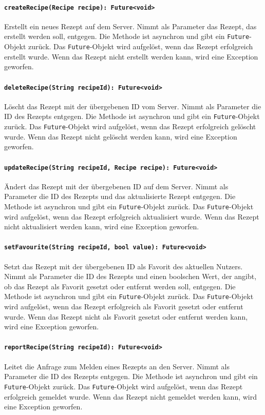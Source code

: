 \documentclass{entwurfsheft}
\begin{document}
\begin{sloppypar}
\paragraph{\texttt{createRecipe(Recipe recipe): Future<void>}}
Erstellt ein neues Rezept auf dem Server. Nimmt als Parameter das Rezept, das erstellt werden soll, entgegen. Die Methode ist asynchron und gibt ein \texttt{Future}-Objekt zurück. Das \texttt{Future}-Objekt wird aufgelöst, wenn das Rezept erfolgreich erstellt wurde. Wenn das Rezept nicht erstellt werden kann, wird eine Exception geworfen.
\paragraph{\texttt{deleteRecipe(String recipeId): Future<void>}}
Löscht das Rezept mit der übergebenen ID vom Server. Nimmt als Parameter die ID des Rezepts entgegen. Die Methode ist asynchron und gibt ein \texttt{Future}-Objekt zurück. Das \texttt{Future}-Objekt wird aufgelöst, wenn das Rezept erfolgreich gelöscht wurde. Wenn das Rezept nicht gelöscht werden kann, wird eine Exception geworfen.
\paragraph{\texttt{updateRecipe(String recipeId, Recipe recipe): Future<void>}}
Ändert das Rezept mit der übergebenen ID auf dem Server. Nimmt als Parameter die ID des Rezepts und das aktualisierte Rezept entgegen. Die Methode ist asynchron und gibt ein \texttt{Future}-Objekt zurück. Das \texttt{Future}-Objekt wird aufgelöst, wenn das Rezept erfolgreich aktualisiert wurde. Wenn das Rezept nicht aktualisiert werden kann, wird eine Exception geworfen.
\paragraph{\texttt{setFavourite(String recipeId, bool value): Future<void>}}
Setzt das Rezept mit der übergebenen ID als Favorit des aktuellen Nutzers. Nimmt als Parameter die ID des Rezepts und einen boolschen Wert, der angibt, ob das Rezept als Favorit gesetzt oder entfernt werden soll, entgegen. Die Methode ist asynchron und gibt ein \texttt{Future}-Objekt zurück. Das \texttt{Future}-Objekt wird aufgelöst, wenn das Rezept erfolgreich als Favorit gesetzt oder entfernt wurde. Wenn das Rezept nicht als Favorit gesetzt oder entfernt werden kann, wird eine Exception geworfen.
\paragraph{\texttt{reportRecipe(String recipeId): Future<void>}}
Leitet die Anfrage zum Melden eines Rezepts an den Server. Nimmt als Parameter die ID des Rezepts entgegen. Die Methode ist asynchron und gibt ein \texttt{Future}-Objekt zurück. Das \texttt{Future}-Objekt wird aufgelöst, wenn das Rezept erfolgreich gemeldet wurde. Wenn das Rezept nicht gemeldet werden kann, wird eine Exception geworfen.
\newpage

\end{sloppypar}
\end{document}
